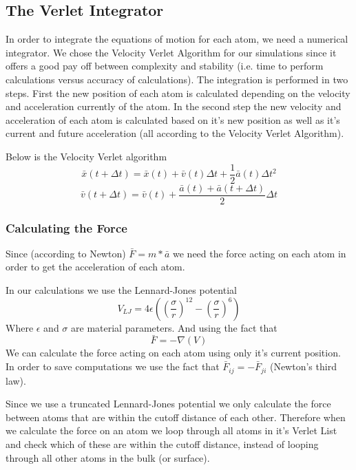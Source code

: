 \subsection{The Verlet Integrator}
In order to integrate the equations of motion for each atom, we need a numerical
integrator. We chose the Velocity Verlet Algorithm for our simulations since it
offers a good pay off between complexity and stability (i.e. time to perform
calculations versus accuracy of calculations). The integration is performed in
two steps. First the new position of each atom is calculated depending on the
velocity and acceleration currently of the atom. In the second step the
new velocity and acceleration of each atom is calculated based on it's new
position as well as it's current and future acceleration (all according to the
Velocity Verlet Algorithm).

Below is the Velocity Verlet algorithm
\begin{equation}
\bar{x}(t + \Delta t) = \bar{x}(t) + \bar{v}(t)\Delta t +
\frac{1}{2}\bar{a}(t)\Delta t^2
\end{equation}
\begin{equation}
\bar{v}(t + \Delta t) = \bar{v}(t) + \frac{\bar{a}(t) + \bar{a}(t+\Delta t)}{2}\Delta t
\end{equation}

\subsubsection{Calculating the Force}
Since (according to Newton) $\bar{F} = m*\bar{a}$ we need the force acting on
each atom in order to get the acceleration of each atom.

In our calculations we use the Lennard-Jones potential
\begin{equation}
V_{LJ} = 4\epsilon\left( \left(\frac{\sigma}{r}\right)^{12} - \left(
\frac{\sigma}{r} \right)^6 \right)
\end{equation}
Where $\epsilon$ and $\sigma$ are material parameters.
And using the fact that 
\begin{equation}
\bar{F} = -\nabla(V)
\end{equation}
We can calculate the force acting on each atom using only it's current position.
In order to save computations we use the fact that $\bar{F}_{ij} = -
\bar{F}_{ji}$ (Newton's third law).

Since we use a truncated Lennard-Jones potential we only calculate the force
between atoms that are within the cutoff distance of each other. Therefore when
we calculate the force on an atom we loop through all atoms in it's Verlet List
and check which of these are within the cutoff distance, instead of looping
through all other atoms in the bulk (or surface).
